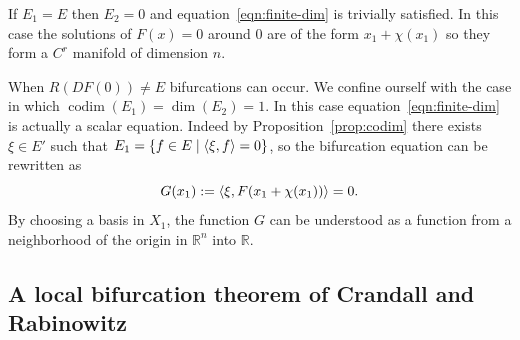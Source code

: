 \documentclass[a4paper,11pt]{article}
\theoremstyle{definition}
\DeclareMathOperator{\codim}{codim}
\DeclarePairedDelimiter{\dual}{\langle}{\rangle}
\begin{document}
If $E_1=E$ then $E_2=0$ and equation~\eqref{eqn:finite-dim} is trivially satisfied. In this case the solutions of $F(x)=0$ around 0 are of the form $x_1+\chi(x_1)$ so they form a $C^r$ manifold of dimension $n$.

When $R(DF(0))\neq E$ bifurcations can occur. We confine ourself with the case in which $\codim(E_1)=\dim(E_2)=1$. In this case equation~\eqref{eqn:finite-dim} is actually a scalar equation. Indeed by Proposition~\ref{prop:codim} there exists $\xi\in E'$ such that $E_1=\{f\in E\;|\;\dual{\xi,f}=0\}$, so the bifurcation equation can be rewritten as
\[
G(x_1):=\dual{\xi,F(x_1+\chi(x_1))}=0.
\]
By choosing a basis in $X_1$, the function $G$ can be understood as a function from a neighborhood of the origin in $\mathbb{R}^n$ into $\mathbb{R}$.

\subsection{A local bifurcation theorem of Crandall and Rabinowitz}
\end{document}
